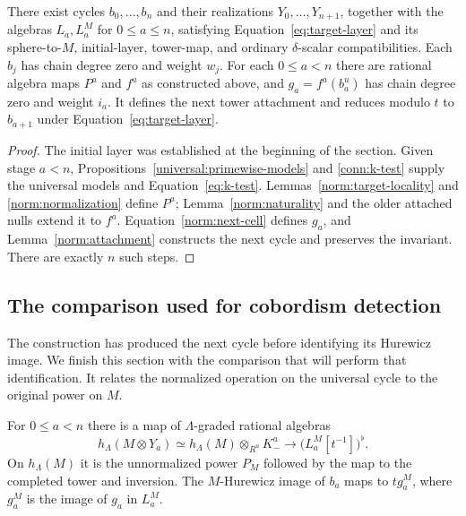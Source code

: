 \begin{proposition}
\label{norm:construction}
There exist cycles $b_0,\ldots,b_n$ and their realizations
$Y_0,\ldots,Y_{n+1}$, together with the algebras $L_a,L_a^M$ for
$0\leq a\leq n$, satisfying Equation~\eqref{eq:target-layer} and
its sphere-to-$M$, initial-layer, tower-map, and ordinary
$\delta$-scalar compatibilities. Each $b_j$ has chain degree zero
and weight $w_j$. For each $0\leq a<n$
there are rational algebra maps $P^a$ and $f^a$ as constructed above,
and $g_a=f^a(b_a^u)$ has chain degree zero and weight $i_a$.
It defines the next tower attachment and reduces modulo $t$ to
$b_{a+1}$ under Equation~\eqref{eq:target-layer}.
\end{proposition}

\begin{proof}
The initial layer was established at the beginning of the section.
Given stage $a<n$, Propositions~\ref{universal:primewise-models} and
\ref{conn:k-test} supply the universal models and
Equation~\eqref{eq:k-test}.  Lemmas~\ref{norm:target-locality} and
\ref{norm:normalization} define $P^a$; Lemma~\ref{norm:naturality}
and the older attached nulls extend it to $f^a$.
Equation~\eqref{norm:next-cell} defines $g_a$, and
Lemma~\ref{norm:attachment} constructs the next cycle and preserves
the invariant.  There are exactly $n$ such steps.
\end{proof}

\subsection{The comparison used for cobordism detection}

The construction has produced the next cycle before identifying
its Hurewicz image.  We finish this section with the comparison that
will perform that identification.  It relates the normalized
operation on the universal cycle to the original power on $M$.

\begin{proposition}
\label{norm:recovery}
For $0\leq a<n$ there is a map of $\Lambda$-graded rational algebras
\begin{equation}
\label{eq:recovery}
 h_\Lambda(M\otimes Y_a)
 \simeq h_\Lambda(M)\otimes_{R^a}K_-^a
 \longrightarrow \bigl(L_a^M[t^{-1}]\bigr)^\flat.
\end{equation}
On $h_\Lambda(M)$ it is the unnormalized power $P_M$ followed by
the map to the completed tower and inversion.  The $M$-Hurewicz
image of $b_a$ maps to $t g_a^M$, where $g_a^M$ is the image of
$g_a$ in $L_a^M$.
\end{proposition}

